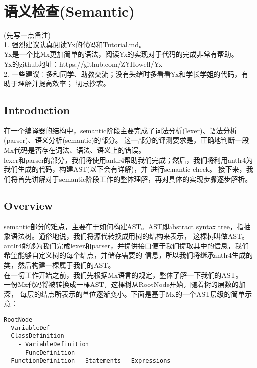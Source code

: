 \chapter{语义检查(Semantic)}
\noindent
(先写一点备注) \\
1. 强烈建议认真阅读Yx的代码和Tutorial.md。 \\
Yx是一个比Mx更加简单的语法，阅读Yx的实现对于代码的完成非常有帮助。\\
Yx的github地址：https://github.com/ZYHowell/Yx \\
2. 一些建议：多和同学、助教交流；没有头绪时多看看Yx和学长学姐的代码，有助于理解并提高效率；
切忌抄袭。\\

\section{Introduction}
在一个编译器的结构中，semantic阶段主要完成了词法分析(lexer)、语法分析(parser)、语义分析(semantic)的部分。
这一部分的评测要求是，正确地判断一段Mx代码是否存在词法、语法、语义上的错误。\\

lexer和parser的部分，我们将使用antlr4帮助我们完成；然后，我们将利用antlr4为我们生成的代码，构建AST(以下会有详解)，并
进行semantic check。
接下来，我们将首先讲解对于semantic阶段工作的整体理解，再对具体的实现步骤逐步解析。

\section{Overview}
semantic部分的难点，主要在于如何构建AST。AST即abstract syntax tree，指抽象语法树。通俗地说，我们将源代转换成用树的结构来表示，
这棵树叫做AST。antlr4能够为我们完成lexer和parser，并提供接口便于我们提取其中的信息，我们希望能够自定义树的每个结点，并储存需要的
信息，所以我们将继承antlr4生成的类，然后构建一棵属于我们的AST。\\

在一切工作开始之前，我们先根据Mx语言的规定，整体了解一下我们的AST。 \\

一份Mx代码将被转换成一棵AST，这棵树从RootNode开始，随着树的层数的加深，
每层的结点所表示的单位逐渐变小。下面是基于Mx的一个AST层级的简单示意：
\begin{verbatim}
RootNode 
- VariableDef
- ClassDefinition
    - VariableDefinition
    - FuncDefinition
- FunctionDefinition - Statements - Expressions 
\end{verbatim}

